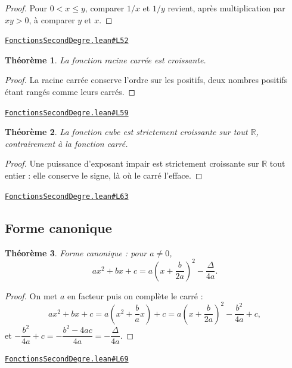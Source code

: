 \documentclass[11pt,a4paper]{article}
\theoremstyle{definition}
\theoremstyle{plain}
\newtheorem{theoreme}{Théorème}
\newcommand{\source}[2]{\par\smallskip\noindent\hfill{\footnotesize\href{#1}{\texttt{#2}}}\par\smallskip}
\begin{document}
\begin{proof}
Pour $0 < x \le y$, comparer $1/x$ et $1/y$ revient, après multiplication par $xy > 0$,
à comparer $y$ et $x$.
\end{proof}
\source{https://github.com/Commutator-IO/learn-lean/blob/main/courses/02-lycee/02-fonctions-second-degre/FonctionsSecondDegre.lean\#L52}{FonctionsSecondDegre.lean\#L52}

\begin{theoreme}
La fonction racine carrée est croissante.
\end{theoreme}

\begin{proof}
La racine carrée conserve l'ordre sur les positifs, deux nombres positifs étant rangés
comme leurs carrés.
\end{proof}
\source{https://github.com/Commutator-IO/learn-lean/blob/main/courses/02-lycee/02-fonctions-second-degre/FonctionsSecondDegre.lean\#L59}{FonctionsSecondDegre.lean\#L59}

\begin{theoreme}
La fonction cube est strictement croissante sur tout $\mathbb{R}$, contrairement à la
fonction carré.
\end{theoreme}

\begin{proof}
Une puissance d'exposant impair est strictement croissante sur $\mathbb{R}$ tout entier :
elle conserve le signe, là où le carré l'efface.
\end{proof}
\source{https://github.com/Commutator-IO/learn-lean/blob/main/courses/02-lycee/02-fonctions-second-degre/FonctionsSecondDegre.lean\#L63}{FonctionsSecondDegre.lean\#L63}

\subsection{Forme canonique}

\begin{theoreme}
Forme canonique : pour $a \ne 0$,
\[ ax^2 + bx + c = a\left(x + \frac{b}{2a}\right)^2 - \frac{\Delta}{4a} . \]
\end{theoreme}

\begin{proof}
On met $a$ en facteur puis on complète le carré :
\[ ax^2 + bx + c = a\left(x^2 + \frac{b}{a}x\right) + c
   = a\left(x + \frac{b}{2a}\right)^2 - \frac{b^2}{4a} + c , \]
et $-\dfrac{b^2}{4a} + c = -\dfrac{b^2 - 4ac}{4a} = -\dfrac{\Delta}{4a}$.
\end{proof}
\source{https://github.com/Commutator-IO/learn-lean/blob/main/courses/02-lycee/02-fonctions-second-degre/FonctionsSecondDegre.lean\#L69}{FonctionsSecondDegre.lean\#L69}
\end{document}
